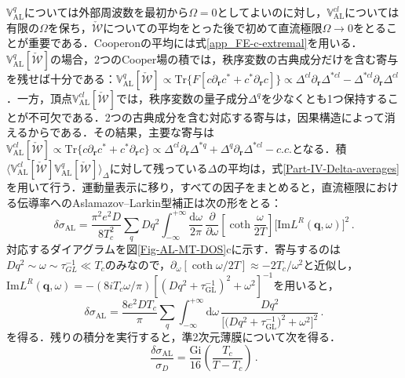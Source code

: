 \documentclass[a4paper,11pt]{ltjsarticle}
\def\Tr{\mathrm{Tr}}
\def\d{\mathrm{d}}
\def\qo{(\mathbf{q},\omega)}
\begin{document}
$\mathbb{V}^{q}_{\mathrm{AL}}$については外部周波数を最初から$\Omega=0$としてよいのに対し，$\mathbb{V}^{cl}_{\mathrm{AL}}$については有限の$\Omega$を保ち，$\check{\mathcal{W}}$についての平均をとった後で初めて直流極限$\Omega\to 0$をとることが重要である．Cooperonの平均には式\eqref{app_FE-c-extremal}を用いる．$\mathbb{V}^{q}_{\mathrm{AL}}[\check{\mathcal{W}}]$の場合，2つのCooper場の積では，秩序変数の古典成分だけを含む寄与を残せば十分である：$\mathbb{V}^{q}_{\mathrm{AL}}[\check{\mathcal{W}}]\propto\Tr\big\{F[c\partial_{\mathbf{r}}c^{*}+c^{*}\partial_{\mathbf{r}}c]\big\}\propto\Delta^{cl}\partial_{\mathbf{r}}\Delta^{*cl}-\Delta^{*cl}\partial_{\mathbf{r}}\Delta^{cl}$．一方，頂点$\mathbb{V}^{cl}_{\mathrm{AL}}[\check{\mathcal{W}}]$では，秩序変数の量子成分$\Delta^{q}$を少なくとも1つ保持することが不可欠である．2つの古典成分を含む対応する寄与は，因果構造によって消えるからである．その結果，主要な寄与は$\mathbb{V}^{cl}_{\mathrm{AL}}[\check{\mathcal{W}}]\propto\Tr\big\{c\partial_{\mathbf{r}}c^{*}+c^{*}\partial_{\mathbf{r}}c\big\}\propto\Delta^{cl}\partial_{\mathbf{r}}\Delta^{*q}+\Delta^{q}\partial_{\mathbf{r}}\Delta^{*cl}-c.c.$となる．積$\big\langle\mathbb{V}^{cl}_{\mathrm{AL}}[\check{\mathcal{W}}]\mathbb{V}^{q}_{\mathrm{AL}}[\check{\mathcal{W}}]\big\rangle_{\Delta}$に対して残っている$\Delta$の平均は，式\eqref{Part-IV-Delta-averages}を用いて行う．運動量表示に移り，すべての因子をまとめると，直流極限における伝導率へのAslamazov--Larkin型補正は次の形をとる：
\begin{equation}
\delta\sigma_{\mathrm{AL}}=\frac{\pi^{2}
e^{2}D}{8T^{2}_{c}}\sum_{q}Dq^{2}
\int^{+\infty}_{-\infty}\frac{\d\omega}{2\pi}\,
\frac{\partial}{\partial\omega}\left[\coth\frac{\omega}{2T}\right]
\big[\mathrm{Im}L^{R}\qo\big]^{2}\,.
\end{equation}
対応するダイアグラムを図\ref{Fig-AL-MT-DOS}cに示す．寄与するのは$Dq^2\sim\omega\sim\tau^{-1}_{GL}\ll T_{c}$のみなので，$\partial_{\omega}[\coth\omega/2T]\approx-2T_{c}/\omega^2$と近似し，$\mathrm{Im}L^{R}\qo=-(8iT_{c}\omega/\pi)[(Dq^{2}+\tau^{-1}_{\mathrm{GL}})^2+\omega^2]^{-1}$を用いると，
\begin{equation}\label{Part-IV-sigma-AL}
\delta\sigma_{\mathrm{AL}}=\frac{8e^{2}DT_c}{\pi}\sum_{q}\int^{+\infty}_{-\infty}\!\!\d\omega\,
\frac{Dq^{2}}{\big[\big(Dq^{2}+\tau^{-1}_{\mathrm{GL}}\big)^{2}+\omega^{2}\big]^{2}}\,.
\end{equation}
を得る．残りの積分を実行すると，準2次元薄膜について次を得る．
\begin{equation}
\frac{\delta\sigma_{\mathrm{AL}}}{\sigma_{D}}=\frac{\mathrm{Gi}}{16}
\left(\frac{T_{c}}{T-T_{c}}\right)\,.
\end{equation}
\end{document}
